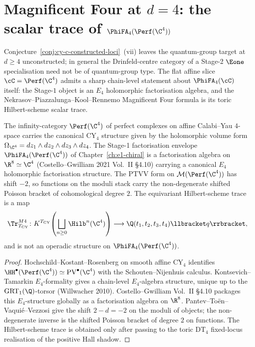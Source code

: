 \section{Magnificent Four at \texorpdfstring{$d = 4$}{d=4}: the scalar trace of \texorpdfstring{$\PhiFA_4(\Perf(\C^4))$}{Phi-FA-4(Perf(C4))}}
\label{sec:magnificent-four-d4}

Conjecture~\ref{conj:cy-c-constructed-loci}~(vii) leaves the quantum-group
target at $d \geq 4$ unconstructed; in general the Drinfeld-centre
category of a Stage-2 $\Eone$ specialisation need not be of
quantum-group type. The flat affine slice $\cC = \Perf(\C^4)$ admits a
sharp chain-level statement about $\PhiFA_4(\cC)$ itself: the
Stage-$1$ object is an $E_4$ holomorphic factorisation algebra, and the
Nekrasov--Piazzalunga--Kool--Rennemo Magnificent Four formula is its
toric Hilbert-scheme scalar trace.

\begin{theorem}
\label{thm:mag-four-e4-structure-qgr}
The infinity-category $\Perf(\C^4)$ of perfect complexes on affine
Calabi--Yau $4$-space carries the canonical CY$_4$ structure given by
the holomorphic volume form
$\Omega_{\C^4} = dz_1 \wedge dz_2 \wedge dz_3 \wedge dz_4$. The
Stage-1 factorisation envelope
$\PhiFA_4(\Perf(\C^4))$ of Chapter~\ref{ch:e1-chiral} is a factorisation
algebra on $\R^8 \simeq \C^4$ (Costello--Gwilliam 2021 Vol.~II
\S 4.10) carrying a canonical $E_4$ holomorphic factorisation structure.
The PTVV form on $\mathcal M(\Perf(\C^4))$ has shift $-2$, so functions
on the moduli stack carry the non-degenerate shifted Poisson bracket of
cohomological degree $2$.
The equivariant Hilbert-scheme trace is a map
\[
 \Tr^{M4}_{T_{\mathrm{CY}}}\colon
 K^{T_{\mathrm{CY}}}\!\left(\bigsqcup_{n\geq0}\Hilb^n(\C^4)\right)
 \longrightarrow \Q(t_1,t_2,t_3,t_4)\llbracket q\rrbracket ,
\]
and is not an operadic structure on $\PhiFA_4(\Perf(\C^4))$.
\end{theorem}

\begin{proof}
Hochschild--Kostant--Rosenberg on smooth affine CY$_4$ identifies
$\HH^\bullet(\Perf(\C^4)) \simeq \mathrm{PV}^\bullet(\C^4)$ with
the Schouten--Nijenhuis calculus. Kontsevich--Tamarkin $E_4$-formality
gives a chain-level $E_4$-algebra structure, unique up to the
$\mathrm{GRT}_1(\Q)$-torsor (Willwacher 2010). Costello--Gwilliam
Vol.~II \S 4.10 packages this $E_4$-structure globally as a
factorisation algebra on $\R^8$. Pantev--To\"en--Vaqui\'e--Vezzosi give
	the shift $2-d=-2$ on the moduli of objects; the non-degenerate inverse
	is the shifted Poisson bracket of degree $2$ on functions. The Hilbert-scheme trace
is obtained only after passing to the toric DT$_4$ fixed-locus
realisation of the positive Hall shadow.
\end{proof}

